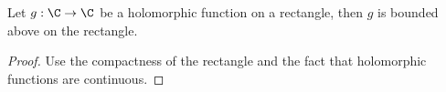 \begin{lemma}[BddAboveOnRect]
\label{BddAboveOnRect}
\leanok
Let $g : \C \to \C$ be a holomorphic function on a rectangle, then $g$ is bounded above on the rectangle.
\end{lemma}
\begin{proof}
\leanok
Use the compactness of the rectangle and the fact that holomorphic functions are continuous.
\end{proof}
